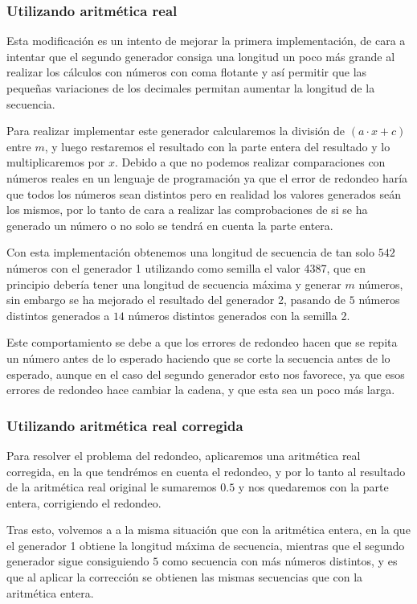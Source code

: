 \documentclass[12pt, spanish]{article}
\begin{document}
\subsubsection{Utilizando aritmética real}

Esta modificación es un intento de mejorar la primera implementación, de cara a intentar que el segundo generador consiga una longitud un poco más grande al realizar los cálculos con números con coma flotante y así permitir que las pequeñas variaciones de los decimales permitan aumentar la longitud de la secuencia.

Para realizar implementar este generador calcularemos la división de $(a \cdot x + c)$ entre $m$, y luego restaremos el resultado con la parte entera del resultado y lo multiplicaremos por $x$. Debido a que no podemos realizar comparaciones con números reales en un lenguaje de programación ya que el error de redondeo haría que todos los números sean distintos pero en realidad los valores generados seán los mismos, por lo tanto de cara a realizar las comprobaciones de si se ha generado un número o no solo se tendrá en cuenta la parte entera.

Con esta implementación obtenemos una longitud de secuencia de tan solo $542$ números con el generador 1 utilizando como semilla el valor 4387, que en principio debería tener una longitud de secuencia máxima y generar $m$ números, sin embargo se ha mejorado el resultado del generador 2, pasando de $5$ números distintos generados a $14$ números distintos generados con la semilla 2.

Este comportamiento se debe a que los errores de redondeo hacen que se repita un número antes de lo esperado haciendo que se corte la secuencia antes de lo esperado, aunque en el caso del segundo generador esto nos favorece, ya que esos errores de redondeo hace cambiar la cadena, y que esta sea un poco más larga.


\subsubsection{Utilizando aritmética real corregida}

Para resolver el problema del redondeo, aplicaremos una aritmética real corregida, en la que tendrémos en cuenta el redondeo, y por lo tanto al resultado de la aritmética real original le sumaremos $0.5$ y nos quedaremos con la parte entera, corrigiendo el redondeo.

Tras esto, volvemos a a la misma situación que con la aritmética entera, en la que el generador 1 obtiene la longitud máxima de secuencia, mientras que el segundo generador sigue consiguiendo $5$ como secuencia con más números distintos, y es que al aplicar la corrección se obtienen las mismas secuencias que con la aritmética entera.
\end{document}
